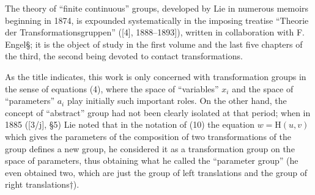 
The theory of ``finite continuous'' groups, developed by Lie in numerous memoirs beginning in 1874, is expounded systematically in the imposing treatise ``Theorie der Transformationsgruppen'' ({[}4{]}, 1888--1893{]}), written in collaboration with F. Engel§; it is the object of study in the first volume and the last five chapters of the third, the second being devoted to contact transformations.

As the title indicates, this work is only concerned with transformation groups in the sense of equations (4), where the space of ``variables'' \(x_{i}\) and the space of ``parameters'' \(a_{i}\) play initially such important roles. On the other hand, the concept of ``abstract'' group had not been clearly isolated at that period; when in 1885 ({[}3/j{]}, §5) Lie noted that in the notation of (10) the equation \(w = \mathrm{H}(u, v)\) which gives the parameters of the composition of two transformations of the group defines a new group, he considered it as a transformation group on the space of parameters, thus obtaining what he called the ``parameter group'' (he even obtained two, which are just the group of left translations and the group of right translations†).

